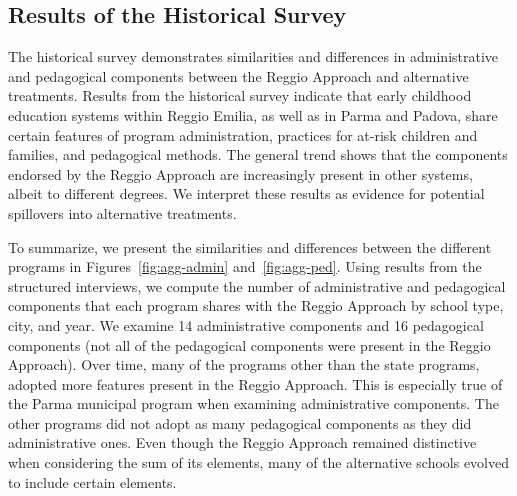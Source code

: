 \subsection{Results of the Historical Survey}

The historical survey demonstrates similarities and differences in administrative and pedagogical components between the Reggio Approach and alternative treatments. Results from the historical survey indicate that early childhood education systems within Reggio Emilia, as well as in Parma and Padova, share certain features of program administration, practices for at-risk children and families, and pedagogical methods. The general trend shows that the components endorsed by the Reggio Approach are increasingly present in other systems, albeit to different degrees. We interpret these results as evidence for potential spillovers into alternative treatments.



To summarize, we present the similarities and differences between the different programs in Figures~\ref{fig:agg-admin} and~\ref{fig:agg-ped}. Using results from the structured interviews, we compute the number of administrative and pedagogical components that each program shares with the Reggio Approach by school type, city, and year. We examine 14 administrative components and 16 pedagogical components (not all of the pedagogical components were present in the Reggio Approach). Over time, many of the programs other than the state programs, adopted more features present in the Reggio Approach. This is especially true of the Parma municipal program when examining administrative components. The other programs did not adopt as many pedagogical components as they did administrative ones. Even though the Reggio Approach remained distinctive when considering the sum of its elements, many of the alternative schools evolved to include certain elements.

